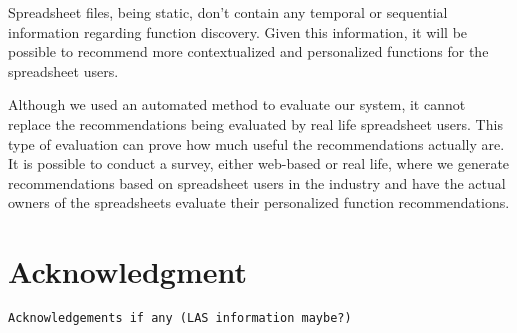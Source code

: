 \documentclass[conference]{IEEEtran}
\begin{document}
Spreadsheet files, being static, don't contain any temporal or sequential information regarding function discovery. Given this information, it will be possible to recommend more contextualized and personalized functions for the spreadsheet users.

Although we used an automated method to evaluate our system, it cannot replace the recommendations being evaluated by real life spreadsheet users. This type of evaluation can prove how much useful the recommendations actually are. It is possible to conduct a survey, either web-based or real life, where we generate recommendations based on spreadsheet users in the industry and have the actual owners of the spreadsheets evaluate their personalized function recommendations.

\section*{Acknowledgment}
\texttt{Acknowledgements if any (LAS information maybe?)}






%





\end{document}

